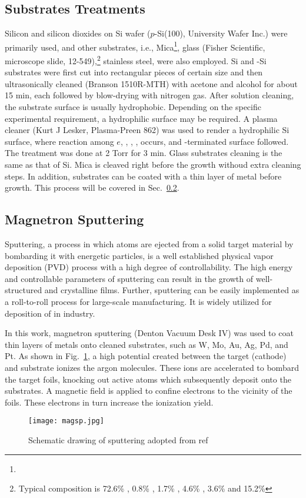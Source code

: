 \subsection{Substrates Treatments}\label{ch2sub}

Silicon and silicon dioxides on Si wafer ($p$-Si(100), University Wafer Inc.) were primarily used, and other substrates, i.e., Mica\footnote{}, glass (Fisher Scientific, microscope slide, 12-549),\footnote{Typical composition is 72.6\% , 0.8\% , 1.7\% , 4.6\% , 3.6\%  and 15.2\% } stainless steel, were also employed. Si and -Si substrates were first cut into rectangular pieces of certain size and then ultrasonically cleaned (Branson 1510R-MTH) with acetone and alcohol for about 15 min, each followed by blow-drying with nitrogen gas. After solution cleaning, the substrate surface is usually hydrophobic. Depending on the specific experimental requirement, a hydrophilic surface may be required. A plasma cleaner (Kurt J Lesker, Plasma-Preen 862) was used to render a hydrophilic Si surface, where reaction among $e$, , , , occurs, and -terminated surface followed.\cite{Habib2010} The treatment was done at 2 Torr  for 3 min. Glass substrates cleaning is the same as that of Si. Mica is cleaved right before the growth withoud extra cleaning steps. In addition, substrates can be coated with a thin layer of metal before growth. This process will be covered in Sec.~\ref{sec:mag}.

\subsection{Magnetron Sputtering}\label{sec:mag}
Sputtering, a process in which atoms are ejected from a solid target material by bombarding it with energetic particles, is a well established physical vapor deposition (PVD) process with a high degree of controllability. The high energy and controllable parameters of sputtering can result in the growth of well-structured and crystalline films. Further, sputtering can be easily implemented as a roll-to-roll process for large-scale manufacturing. It is widely utilized for deposition of  in industry.

In this work, magnetron sputtering (Denton Vacuum Desk IV) was used to coat thin layers of metals onto cleaned substrates, such as W, Mo, Au, Ag, Pd, and Pt. As shown in Fig.~\ref{fig:ch2magsp}, a high potential created between the target (cathode) and substrate ionizes the argon molecules. These ions are accelerated to bombard the target foils, knocking out active atoms which subsequently deposit onto the substrates. A magnetic field is applied to confine electrons to the vicinity of the foils. These electrons in turn increase the ionization yield. 
\begin{figure}[htb]
\centering
\texttt{[image: magsp.jpg]}
\caption[magnetron sputtering system]{Schematic drawing of sputtering adopted from ref\cite{Song2008}}
\label{fig:ch2magsp}
\end{figure}

